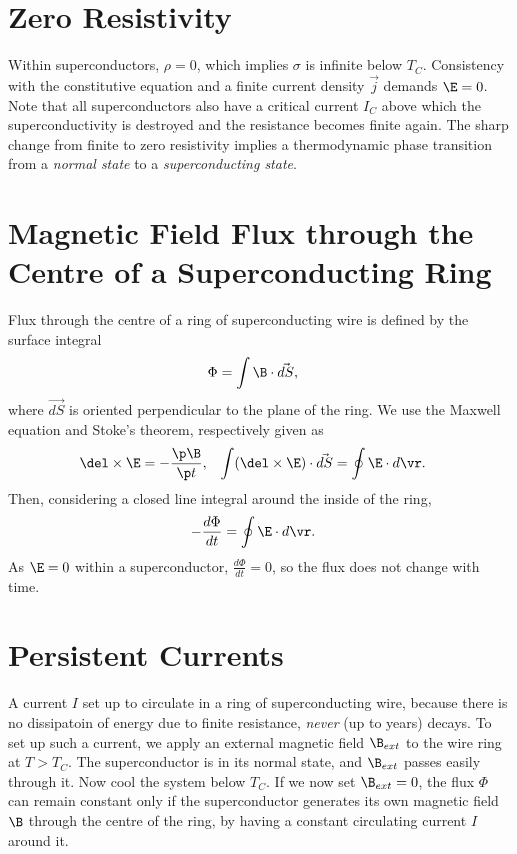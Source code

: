 \documentclass[qo.tex]{subfiles}
\begin{document}
\section{Zero Resistivity}
Within superconductors, $\rho=0$, which implies $\sigma$ is infinite below $T_C$.
Consistency with the constitutive equation and a finite current density $\vec{j}$ demands $\E=0$.
Note that all superconductors also have a critical current $I_C$ above which the superconductivity is destroyed and the resistance becomes finite again. 
The sharp change from finite to zero resistivity implies a thermodynamic phase transition from a \emph{normal state} to a \emph{superconducting state}.

\section{Magnetic Field Flux through the Centre of a Superconducting Ring}
Flux through the centre of a ring of superconducting wire is defined by the surface integral
\begin{align}
    \Phi &= \int \B\cdot \vec{dS},
\end{align}
where $\vec{dS}$ is oriented perpendicular to the plane of the ring.
We use the Maxwell equation and Stoke's theorem, respectively given as
\begin{align}
    \del\times\E &= -\frac{\p\B}{\p t}, & \int(\del\times\E)\cdot\vec{dS} &= \oint \E\cdot d\vr.
\end{align}
Then, considering a closed line integral around the inside of the ring, 
\begin{align}
    -\frac{d\Phi}{dt} &= \oint \E\cdot d\vr.
\end{align}
As $\E=0$ within a superconductor, $\frac{d\Phi}{dt}=0$, so the flux does not change with time. 

\section{Persistent Currents}
A current $I$ set up to circulate in a ring of superconducting wire, because there is no dissipatoin of energy due to finite resistance, \emph{never} (up to years) decays. 
To set up such a current, we apply an external magnetic field $\B_{ext}$ to the wire ring at $T>T_C$.
The superconductor is in its normal state, and $\B_{ext}$ passes easily through it. 
Now cool the system below $T_C$.
If we now set $\B_{ext}=0$, the flux $\Phi$ can remain constant only if the superconductor generates its own magnetic field $\B$ through the centre of the ring, by having a constant circulating current $I$ around it. 
\end{document}
